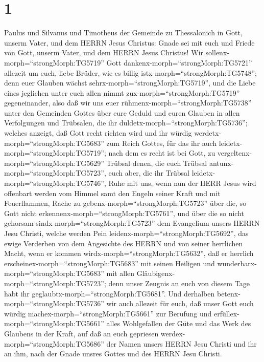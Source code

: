 \hypertarget{section}{%
\section{1}\label{section}}

 Paulus und Silvanus und Timotheus der Gemeinde zu
Thessalonich in Gott, unserm Vater, und dem HERRN Jesus Christus:
 Gnade sei mit euch und Friede von Gott, unserm Vater, und
dem HERRN Jesus Christus!  Wir
sollenx-morph=``strongMorph:TG5719'' Gott
dankenx-morph=``strongMorph:TG5721'' allezeit um euch, liebe Brüder, wie
es billig istx-morph=``strongMorph:TG5748''; denn euer Glauben wächst
sehrx-morph=``strongMorph:TG5719'', und die Liebe eines jeglichen unter
euch allen nimmt zux-morph=``strongMorph:TG5719'' gegeneinander,
 also daß wir uns euer rühmenx-morph=``strongMorph:TG5738''
unter den Gemeinden Gottes über eure Geduld und euren Glauben in allen
Verfolgungen und Trübsalen, die ihr
duldetx-morph=``strongMorph:TG5736'';  welches anzeigt, daß
Gott recht richten wird und ihr würdig
werdetx-morph=``strongMorph:TG5683'' zum Reich Gottes, für das ihr auch
leidetx-morph=``strongMorph:TG5719'';  nach dem es recht ist
bei Gott, zu vergeltenx-morph=``strongMorph:TG5629'' Trübsal denen, die
euch Trübsal antunx-morph=``strongMorph:TG5723'',  euch
aber, die ihr Trübsal leidetx-morph=``strongMorph:TG5746'', Ruhe mit
uns, wenn nun der HERR Jesus wird offenbart werden vom Himmel samt den
Engeln seiner Kraft  und mit Feuerflammen, Rache zu
gebenx-morph=``strongMorph:TG5723'' über die, so Gott nicht
erkennenx-morph=``strongMorph:TG5761'', und über die so nicht gehorsam
sindx-morph=``strongMorph:TG5723'' dem Evangelium unsers HERRN Jesu
Christi,  welche werden Pein
leidenx-morph=``strongMorph:TG5692'', das ewige Verderben von dem
Angesichte des HERRN und von seiner herrlichen Macht,  wenn
er kommen wirdx-morph=``strongMorph:TG5632'', daß er herrlich
erscheinex-morph=``strongMorph:TG5683'' mit seinen Heiligen und
wunderbarx-morph=``strongMorph:TG5683'' mit allen
Gläubigenx-morph=``strongMorph:TG5723''; denn unser Zeugnis an euch von
diesem Tage habt ihr geglaubtx-morph=``strongMorph:TG5681''.
 Und derhalben betenx-morph=``strongMorph:TG5736'' wir auch
allezeit für euch, daß unser Gott euch würdig
machex-morph=``strongMorph:TG5661'' zur Berufung und
erfüllex-morph=``strongMorph:TG5661'' alles Wohlgefallen der Güte und
das Werk des Glaubens in der Kraft,  auf daß an euch
gepriesen werdex-morph=``strongMorph:TG5686'' der Namen unsers HERRN
Jesu Christi und ihr an ihm, nach der Gnade unsres Gottes und des HERRN
Jesu Christi.

